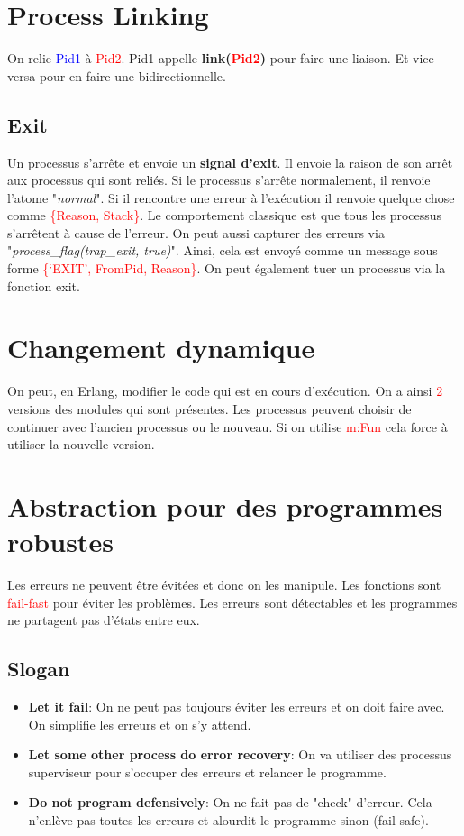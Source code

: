 \documentclass{report}
\begin{document}
\section{Process Linking}
On relie \textcolor{blue}{Pid1} à \textcolor{red}{Pid2}. Pid1 appelle \textbf{link(\textcolor{red}{Pid2})} pour faire une liaison. Et vice versa pour en faire une bidirectionnelle.

\subsection{Exit}
Un processus s'arrête et envoie un \textbf{signal d'exit}. Il envoie la raison de son arrêt aux processus qui sont reliés. Si le processus s'arrête normalement, il renvoie l'atome "\textit{normal}". Si il rencontre une erreur à l'exécution il renvoie quelque chose comme \textcolor{red}{\{Reason, Stack\}}. Le comportement classique est que tous les processus s'arrêtent à cause de l'erreur. On peut aussi capturer des erreurs via "\textit{process\_flag(trap\_exit, true)}". Ainsi, cela est envoyé comme un message sous forme \textcolor{red}{\{‘EXIT’, FromPid, Reason\}}. On peut également tuer un processus via la fonction exit.

\section{Changement dynamique}
On peut, en Erlang, modifier le code qui est en cours d'exécution. On a ainsi \textcolor{red}{2} versions des modules qui sont présentes. Les processus peuvent choisir de continuer avec l'ancien processus ou le nouveau. Si on utilise \textcolor{red}{m:Fun} cela force à utiliser la nouvelle version. 

\section{Abstraction pour des programmes robustes}
Les erreurs ne peuvent être évitées et donc on les manipule. Les fonctions sont \textcolor{red}{fail-fast} pour éviter les problèmes. Les erreurs sont détectables et les programmes ne partagent pas d'états entre eux.

\subsection{Slogan}
\begin{itemize}
\item \textbf{Let it fail}: On ne peut pas toujours éviter les erreurs et on doit faire avec. On simplifie les erreurs et on s'y attend.
\item \textbf{Let some other process do error recovery}: On va utiliser des processus superviseur pour s'occuper des erreurs et relancer le programme. 
\item \textbf{Do not program defensively}: On ne fait pas de "check" d'erreur. Cela n'enlève pas toutes les erreurs et alourdit le programme sinon (fail-safe).
\end{itemize}
\end{document}
